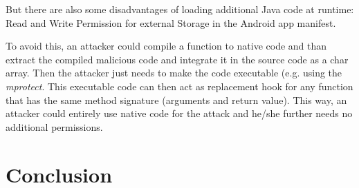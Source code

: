 But there are also some disadvantages of loading additional Java code at runtime: Read and Write Permission for external Storage in the Android app manifest. 

 To avoid this, an attacker could compile a function to native code and than extract the compiled malicious code and integrate it in the source code as a char array. Then the attacker just needs to make the code executable (e.g. using the \textit{mprotect}. This executable code can then act as replacement hook for any function that has the same method signature (arguments and return value).
 This way, an attacker could entirely use native code for the attack and he/she further needs no additional permissions.
\section{Conclusion}